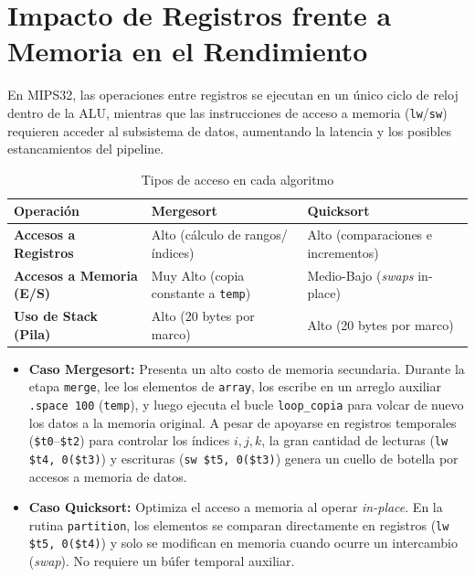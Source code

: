 \documentclass[12pt,a4paper]{article}
\begin{document}
	
	\section{Impacto de Registros frente a Memoria en el Rendimiento}
	
	En MIPS32, las operaciones entre registros se ejecutan en un único ciclo de reloj dentro de la ALU, mientras que las instrucciones de acceso a memoria (\texttt{lw}/\texttt{sw}) requieren acceder al subsistema de datos, aumentando la latencia y los posibles estancamientos del pipeline.
	
	\begin{table}[h!]
		\centering
		\caption{Tipos de acceso en cada algoritmo}
		\vspace{0.2cm}
		\begin{tabularx}{\textwidth}{l | X | X}
			\toprule
			\textbf{Operación} & \textbf{Mergesort} & \textbf{Quicksort} \\
			\midrule
			\textbf{Accesos a Registros} & Alto (cálculo de rangos/índices) & Alto (comparaciones e incrementos) \\
			\midrule
			\textbf{Accesos a Memoria (E/S)} & Muy Alto (copia constante a \texttt{temp}) & Medio-Bajo (\textit{swaps} in-place) \\
			\midrule
			\textbf{Uso de Stack (Pila)} & Alto (20 bytes por marco) & Alto (20 bytes por marco) \\
			\bottomrule
		\end{tabularx}
	\end{table}
	
	\begin{itemize}
		\item \textbf{Caso Mergesort:} Presenta un alto costo de memoria secundaria. Durante la etapa \texttt{merge}, lee los elementos de \texttt{array}, los escribe en un arreglo auxiliar \texttt{.space 100} (\texttt{temp}), y luego ejecuta el bucle \texttt{loop\_copia} para volcar de nuevo los datos a la memoria original. A pesar de apoyarse en registros temporales (\texttt{\$t0}--\texttt{\$t2}) para controlar los índices $i, j, k$, la gran cantidad de lecturas (\texttt{lw \$t4, 0(\$t3)}) y escrituras (\texttt{sw \$t5, 0(\$t3)}) genera un cuello de botella por accesos a memoria de datos.
		\item \textbf{Caso Quicksort:} Optimiza el acceso a memoria al operar \textit{in-place}. En la rutina \texttt{partition}, los elementos se comparan directamente en registros (\texttt{lw \$t5, 0(\$t4)}) y solo se modifican en memoria cuando ocurre un intercambio (\textit{swap}). No requiere un búfer temporal auxiliar.
	\end{itemize}
	
\end{document}
